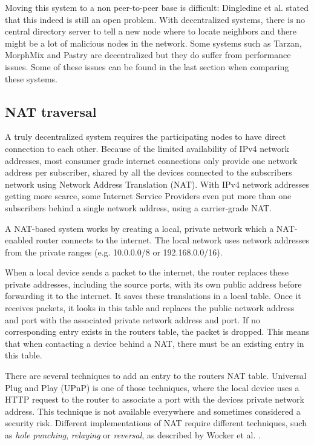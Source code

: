 \documentclass{article}
\begin{document}
		Moving this system to a non peer-to-peer base is difficult: Dingledine et al. stated that this indeed is still an open problem. With decentralized systems, there is no central directory server to tell a new node where to locate neighbors and there might be a lot of malicious nodes in the network. Some systems such as Tarzan, MorphMix and Pastry \cite{rowstron2001pastry, rennhard2002introducing} are decentralized but they do suffer from performance issues. Some of these issues can be found in the last section when comparing these systems.

	\subsection{NAT traversal}
		A truly decentralized system requires the participating nodes to have direct connection to each other. Because of the limited availability of IPv4 network addresses, most consumer grade internet connections only provide one network address per subscriber, shared by all the devices connected to the subscribers network using Network Address Translation (NAT). With IPv4 network addresses getting more scarce, some Internet Service Providers even put more than one subscribers behind a single network address, using a carrier-grade NAT.
		
		A NAT-based system works by creating a local, private network which a NAT-enabled router connects to the internet. The local network uses network addresses from the private ranges (e.g. 10.0.0.0/8 or 192.168.0.0/16).
		
		When a local device sends a packet to the internet, the router replaces these private addresses, including the source ports, with its own public address before forwarding it to the internet. It saves these translations in a local table. Once it receives packets, it looks in this table and replaces the public network address and port with the associated private network address and port. If no corresponding entry exists in the routers table, the packet is dropped. This means that when contacting a device behind a NAT, there must be an existing entry in this table.
		
		There are several techniques to add an entry to the routers NAT table. Universal Plug and Play (UPnP) is one of those techniques, where the local device uses a HTTP request to the router to associate a port with the devices private network address. This technique is not available everywhere and sometimes considered a security risk. Different implementations of NAT require different techniques, such as \textit{hole punching}, \textit{relaying} or \textit{reversal}, as described by Wocker et al. \cite{wacker2008nat}.
\end{document}
